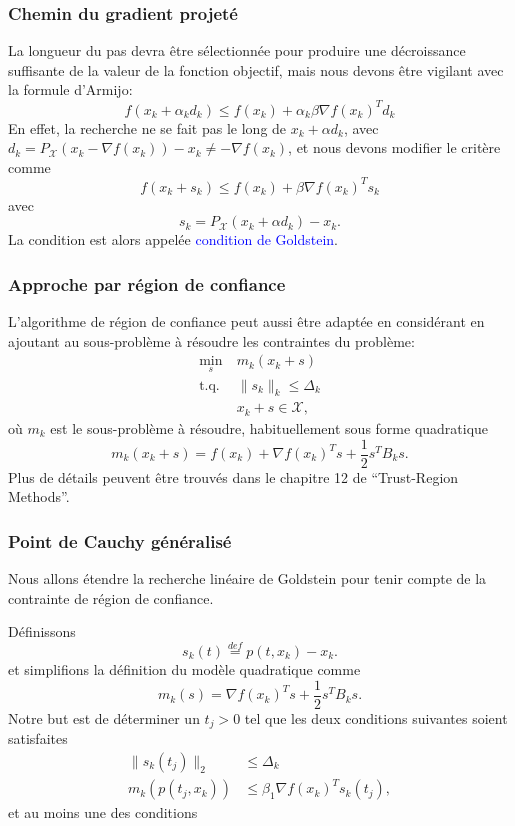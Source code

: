 \documentclass[t,usepdftitle=false]{beamer}
\def\cX{\mathcal{X}}
\begin{document}
\begin{frame}
\frametitle{Chemin du gradient projeté}

La longueur du pas devra être sélectionnée pour produire une décroissance suffisante de la valeur de la fonction objectif, mais nous devons être vigilant avec la formule d'Armijo:
$$
f(x_k + \alpha_k d_k ) \leq f(x_k) + \alpha_k \beta \nabla f(x_k)^T d_k
$$
En effet, la recherche ne se fait pas le long de $x_k + \alpha d_k$, avec
$d_k = P_{\cX} (x_k - \nabla f(x_k)) - x_k \ne -\nabla f(x_k)$,
et nous devons modifier le critère comme
$$
f(x_k + s_k ) \leq f(x_k) + \beta \nabla f(x_k)^T s_k
$$
avec
$$
s_k = P_{\cX}(x_k + \alpha d_k)-x_k.
$$
La condition est alors appelée \textcolor{blue}{condition de Goldstein}.

\end{frame}

\begin{frame}
\frametitle{Approche par région de confiance}

L'algorithme de région de confiance peut aussi être adaptée en considérant en ajoutant au sous-problème à résoudre les contraintes du problème:
\begin{align*}
\min_s\ & m_k(x_k+s) \\
\mbox{t.q. } & \| s_k \|_k \leq \Delta_k \\
& x_k+s \in \cX,
\end{align*}
où $m_k$ est le sous-problème à résoudre, habituellement sous forme quadratique
$$
m_k(x_k+s) = f(x_k) + \nabla f(x_k)^Ts + \frac{1}{2}s^TB_ks.
$$
Plus de détails peuvent être trouvés dans le chapitre 12 de ``Trust-Region Methods''.

\end{frame}

\begin{frame}
\frametitle{Point de Cauchy généralisé}

Nous allons étendre la recherche linéaire de Goldstein pour tenir compte de la contrainte de région de confiance.

\mbox{}

Définissons
$$
s_k(t) \overset{def}{=} p(t,x_k) - x_k.
$$
et simplifions la définition du modèle quadratique comme
$$
m_k(s) = \nabla f(x_k)^Ts + \frac{1}{2}s^TB_ks.
$$
Notre but est de déterminer un $t_j > 0$ tel que les deux conditions suivantes soient satisfaites
\begin{align*}
\| s_k(t_j) \|_2 & \leq \Delta_k \\
m_k(p(t_j,x_k)) & \leq \beta_1 \nabla f(x_k)^T s_k(t_j),
\end{align*} 
et au moins une des conditions

\end{frame}
\end{document}
